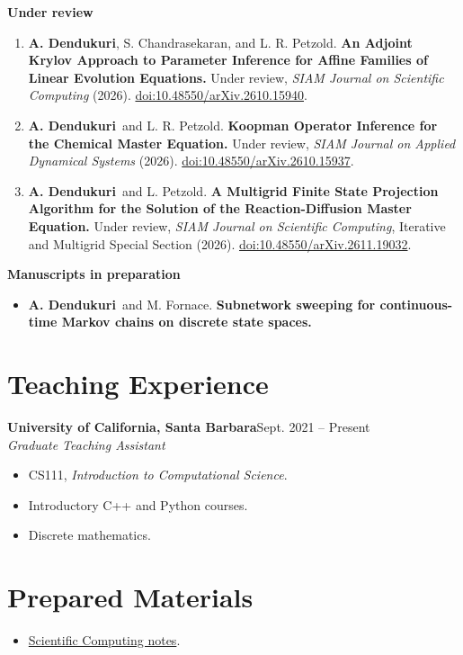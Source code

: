 \documentclass[11pt,letterpaper]{article}
\newcommand{\me}{\textbf{A. Dendukuri}}
\begin{document}
\textbf{Under review}
\begin{enumerate}[resume]
\item \me, S. Chandrasekaran, and L. R. Petzold.
\textbf{An Adjoint Krylov Approach to Parameter Inference for Affine Families of Linear Evolution Equations.}
Under review, \textit{SIAM Journal on Scientific Computing} (2026).
\href{https://doi.org/10.48550/arXiv.2610.15940}{doi:10.48550/arXiv.2610.15940}.
\item \me\ and L. R. Petzold.
\textbf{Koopman Operator Inference for the Chemical Master Equation.}
Under review, \textit{SIAM Journal on Applied Dynamical Systems} (2026).
\href{https://doi.org/10.48550/arXiv.2610.15937}{doi:10.48550/arXiv.2610.15937}.
\item \me\ and L. Petzold.
\textbf{A Multigrid Finite State Projection Algorithm for the Solution of the Reaction-Diffusion Master Equation.}
Under review, \textit{SIAM Journal on Scientific Computing},
Iterative and Multigrid Special Section (2026).
\href{https://doi.org/10.48550/arXiv.2611.19032}{doi:10.48550/arXiv.2611.19032}.
\end{enumerate}

\textbf{Manuscripts in preparation}
\begin{itemize}
\item \me\ and M. Fornace.
\textbf{Subnetwork sweeping for continuous-time Markov chains on discrete state spaces.}
\end{itemize}

\newpage
\section*{Teaching Experience}
\textbf{University of California, Santa Barbara}\hfill Sept. 2021 -- Present\\
\textit{Graduate Teaching Assistant}
\begin{itemize}
\item CS111, \textit{Introduction to Computational Science}.
\item Introductory C++ and Python courses.
\item Discrete mathematics.
\end{itemize}

\section*{Prepared Materials}
\begin{itemize}
\item \href{https://adityadendukuri.github.io/Scientific-Computing-Notes/}{Scientific Computing notes}.
\end{itemize}
\end{document}
